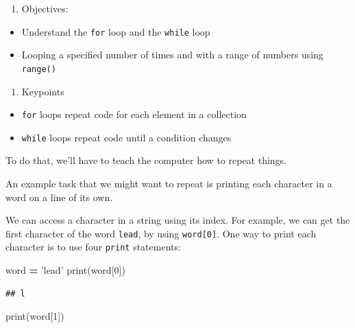 \documentclass[]{book}
\newenvironment{Shaded}{\begin{snugshade}}{\end{snugshade}}
\newcommand{\BuiltInTok}[1]{#1}
\newcommand{\DecValTok}[1]{\textcolor[rgb]{0.00,0.00,0.81}{#1}}
\newcommand{\NormalTok}[1]{#1}
\newcommand{\OperatorTok}[1]{\textcolor[rgb]{0.81,0.36,0.00}{\textbf{#1}}}
\newcommand{\StringTok}[1]{\textcolor[rgb]{0.31,0.60,0.02}{#1}}
\providecommand{\tightlist}{%
  \setlength{\itemsep}{0pt}\setlength{\parskip}{0pt}}
\theoremstyle{definition}
\theoremstyle{definition}
\theoremstyle{definition}
\theoremstyle{remark}
\begin{document}
\begin{enumerate}
\def\labelenumi{\arabic{enumi}.}
\setcounter{enumi}{1}
\tightlist
\item
  Objectives:
\end{enumerate}

\begin{itemize}
\tightlist
\item
  Understand the \texttt{for} loop and the \texttt{while} loop
\item
  Looping a specified number of times and with a range of numbers using
  \texttt{range()}
\end{itemize}

\begin{enumerate}
\def\labelenumi{\arabic{enumi}.}
\setcounter{enumi}{2}
\tightlist
\item
  Keypoints
\end{enumerate}

\begin{itemize}
\tightlist
\item
  \texttt{for} loops repeat code for each element in a collection
\item
  \texttt{while} loops repeat code until a condition changes
\end{itemize}

To do that, we'll have to teach the computer how to repeat things.

An example task that we might want to repeat is printing each character
in a word on a line of its own.

We can access a character in a string using its index. For example, we
can get the first character of the word
\texttt{\textquotesingle{}lead\textquotesingle{}}, by using
\texttt{word{[}0{]}}. One way to print each character is to use four
\texttt{print} statements:

\begin{Shaded}
\begin{Highlighting}[]
\NormalTok{word }\OperatorTok{=} \StringTok{'lead'}
\BuiltInTok{print}\NormalTok{(word[}\DecValTok{0}\NormalTok{])}
\end{Highlighting}
\end{Shaded}

\begin{verbatim}
## l
\end{verbatim}

\begin{Shaded}
\begin{Highlighting}[]
\BuiltInTok{print}\NormalTok{(word[}\DecValTok{1}\NormalTok{])}
\end{Highlighting}
\end{Shaded}
\end{document}
